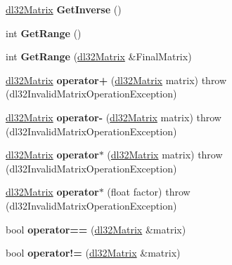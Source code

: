\begin{DoxyCompactItemize}
\item 
\hypertarget{classdl32_matrix_ae442cf8c4b410f2a90084dbff408d4c3}{\hyperlink{classdl32_matrix}{dl32\-Matrix} {\bfseries Get\-Inverse} ()}\label{classdl32_matrix_ae442cf8c4b410f2a90084dbff408d4c3}

\item 
\hypertarget{classdl32_matrix_ab963b98be0fd54d12b86073b05a7aabf}{int {\bfseries Get\-Range} ()}\label{classdl32_matrix_ab963b98be0fd54d12b86073b05a7aabf}

\item 
\hypertarget{classdl32_matrix_aa4149bda7906442a72f726a3963ca784}{int {\bfseries Get\-Range} (\hyperlink{classdl32_matrix}{dl32\-Matrix} \&Final\-Matrix)}\label{classdl32_matrix_aa4149bda7906442a72f726a3963ca784}

\item 
\hypertarget{classdl32_matrix_a6e662d10610a73d87a846589b39c5641}{\hyperlink{classdl32_matrix}{dl32\-Matrix} {\bfseries operator+} (\hyperlink{classdl32_matrix}{dl32\-Matrix} matrix)  throw (dl32\-Invalid\-Matrix\-Operation\-Exception)}\label{classdl32_matrix_a6e662d10610a73d87a846589b39c5641}

\item 
\hypertarget{classdl32_matrix_a0f1983703befe4e2a6c17fdc59ae77f6}{\hyperlink{classdl32_matrix}{dl32\-Matrix} {\bfseries operator-\/} (\hyperlink{classdl32_matrix}{dl32\-Matrix} matrix)  throw (dl32\-Invalid\-Matrix\-Operation\-Exception)}\label{classdl32_matrix_a0f1983703befe4e2a6c17fdc59ae77f6}

\item 
\hypertarget{classdl32_matrix_abe763c04fc70a6e5450436200df393a6}{\hyperlink{classdl32_matrix}{dl32\-Matrix} {\bfseries operator$\ast$} (\hyperlink{classdl32_matrix}{dl32\-Matrix} matrix)  throw (dl32\-Invalid\-Matrix\-Operation\-Exception)}\label{classdl32_matrix_abe763c04fc70a6e5450436200df393a6}

\item 
\hypertarget{classdl32_matrix_adbae95c51003093b95c27d5097a83b44}{\hyperlink{classdl32_matrix}{dl32\-Matrix} {\bfseries operator$\ast$} (float factor)  throw (dl32\-Invalid\-Matrix\-Operation\-Exception)}\label{classdl32_matrix_adbae95c51003093b95c27d5097a83b44}

\item 
\hypertarget{classdl32_matrix_a60b0d52d045abe4b533b977de01e5b54}{bool {\bfseries operator==} (\hyperlink{classdl32_matrix}{dl32\-Matrix} \&matrix)}\label{classdl32_matrix_a60b0d52d045abe4b533b977de01e5b54}

\item 
\hypertarget{classdl32_matrix_aa523f3920c13f9acea9779f0adf2dbf7}{bool {\bfseries operator!=} (\hyperlink{classdl32_matrix}{dl32\-Matrix} \&matrix)}\label{classdl32_matrix_aa523f3920c13f9acea9779f0adf2dbf7}

\end{DoxyCompactItemize}
